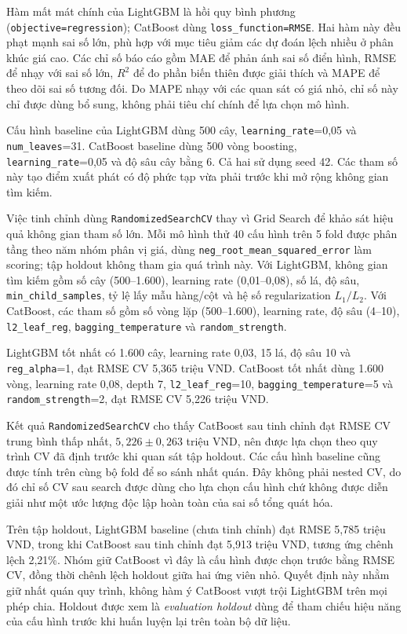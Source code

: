Hàm mất mát chính của LightGBM là hồi quy bình phương (\texttt{objective=regression}); CatBoost dùng \texttt{loss\_function=RMSE}. Hai hàm này đều phạt mạnh sai số lớn, phù hợp với mục tiêu giảm các dự đoán lệch nhiều ở phân khúc giá cao. Các chỉ số báo cáo gồm MAE để phản ánh sai số điển hình, RMSE để nhạy với sai số lớn, $R^2$ để đo phần biến thiên được giải thích và MAPE để theo dõi sai số tương đối. Do MAPE nhạy với các quan sát có giá nhỏ, chỉ số này chỉ được dùng bổ sung, không phải tiêu chí chính để lựa chọn mô hình.

Cấu hình baseline của LightGBM dùng 500 cây, \texttt{learning\_rate}=0,05 và \texttt{num\_leaves}=31. CatBoost baseline dùng 500 vòng boosting, \texttt{learning\_rate}=0,05 và độ sâu cây bằng 6. Cả hai sử dụng seed 42. Các tham số này tạo điểm xuất phát có độ phức tạp vừa phải trước khi mở rộng không gian tìm kiếm.

Việc tinh chỉnh dùng \texttt{RandomizedSearchCV} thay vì Grid Search để khảo sát hiệu quả không gian tham số lớn. Mỗi mô hình thử 40 cấu hình trên 5 fold được phân tầng theo năm nhóm phân vị giá, dùng \texttt{neg\_root\_mean\_squared\_error} làm scoring; tập holdout không tham gia quá trình này. Với LightGBM, không gian tìm kiếm gồm số cây (500--1.600), learning rate (0,01--0,08), số lá, độ sâu, \texttt{min\_child\_samples}, tỷ lệ lấy mẫu hàng/cột và hệ số regularization $L_1/L_2$. Với CatBoost, các tham số gồm số vòng lặp (500--1.600), learning rate, độ sâu (4--10), \texttt{l2\_leaf\_reg}, \texttt{bagging\_temperature} và \texttt{random\_strength}.

LightGBM tốt nhất có 1.600 cây, learning rate 0,03, 15 lá, độ sâu 10 và \texttt{reg\_alpha}=1, đạt RMSE CV 5,365 triệu VND. CatBoost tốt nhất dùng 1.600 vòng, learning rate 0,08, depth 7, \texttt{l2\_leaf\_reg}=10, \texttt{bagging\_temperature}=5 và \texttt{random\_strength}=2, đạt RMSE CV 5,226 triệu VND.

Kết quả \texttt{RandomizedSearchCV} cho thấy CatBoost sau tinh chỉnh đạt RMSE CV trung bình thấp nhất, $5,226 \pm 0,263$ triệu VND, nên được lựa chọn theo quy trình CV đã định trước khi quan sát tập holdout. Các cấu hình baseline cũng được tính trên cùng bộ fold để so sánh nhất quán. Đây không phải nested CV, do đó chỉ số CV sau search được dùng cho lựa chọn cấu hình chứ không được diễn giải như một ước lượng độc lập hoàn toàn của sai số tổng quát hóa.

Trên tập holdout, LightGBM baseline (chưa tinh chỉnh) đạt RMSE 5,785 triệu VND, trong khi CatBoost sau tinh chỉnh đạt 5,913 triệu VND, tương ứng chênh lệch 2,21\%. Nhóm giữ CatBoost vì đây là cấu hình được chọn trước bằng RMSE CV, đồng thời chênh lệch holdout giữa hai ứng viên nhỏ. Quyết định này nhằm giữ nhất quán quy trình, không hàm ý CatBoost vượt trội LightGBM trên mọi phép chia. Holdout được xem là \textit{evaluation holdout} dùng để tham chiếu hiệu năng của cấu hình trước khi huấn luyện lại trên toàn bộ dữ liệu.


